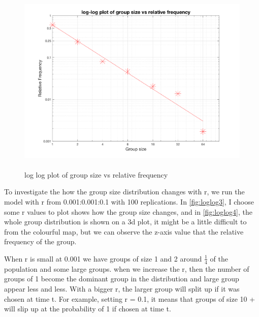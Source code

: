 \documentclass[12pt]{article}
\begin{document}
\begin{figure}[H] %
\centering
\includegraphics[width = 12 cm, height = 9cm]{loglog1.png}
\caption{log log plot of group size vs relative frequency}
\label{fig:loglog1}
\end{figure}

To investigate the how the group size distribution changes with r, we run the model with r from 0.001:0.001:0.1 with 100 replications. In \ref{fig:loglog3}, I choose some r values to plot shows how the group size changes, and in \ref{fig:loglog4}, the whole group distribution is shown on a 3d plot, it might be a little difficult to from the colourful map, but we can observe the z-axis value that the relative frequency of the group. \par
When r is small at 0.001 we have groups of size 1 and 2 around $\frac{1}{4}$ of the population and some large groups. when we increase the r, then the number of groups of 1 become the dominant group in the distribution and large group appear less and less. With a bigger r, the larger group will split up if it was chosen at time t. For example, setting r = 0.1, it means that groups of size 10 + will slip up at the probability of 1 if chosen at time t. 
\end{document}
